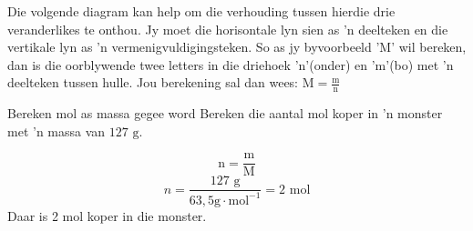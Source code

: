       \label{m38717*id277605}
Die volgende diagram kan help om die verhouding tussen hierdie drie veranderlikes te onthou. Jy moet die horisontale lyn sien as   'n deelteken en die vertikale lyn as   'n vermenigvuldigingsteken. So as jy byvoorbeeld 'M' wil bereken, dan is die oorblywende twee letters in  die driehoek 'n'(onder) en 'm'(bo) met  'n deelteken tussen hulle. Jou berekening sal dan wees:
 $\text{M}=\frac{\text{m}}{\text{n}}$
      \label{m38717*id277613}
    \setcounter{subfigure}{0}
	\begin{figure}[H] %
\begin{center}
\end{center}
 \end{figure}       
      \par 
\label{m38717*secfhsst!!!underscore!!!id409}
      \noindent
      \begin{wex}{Bereken mol as massa gegee word}{
\label{m38717*probfhsst!!!underscore!!!id410}
      \label{m38717*id277635}Bereken die aantal mol koper in  'n monster met  'n massa van $127 \text{ g}$. 
      }
{
      \label{m38717*id277680}\nopagebreak\noindent{}
        
    \begin{equation*}
    \text{n}=\frac{\text{m}}{\text{M}}
      \end{equation*}
      \label{m38717*id277705}\nopagebreak\noindent{}
    \begin{equation*}
    n=\frac{127 \text{ g}}{63,5 \text{g} \cdot \text{mol}^{-1}}=2 \text{ mol}
      \end{equation*}
      \label{m38717*id277735}Daar is 2 mol koper in die monster.
}
    \end{wex}
    
